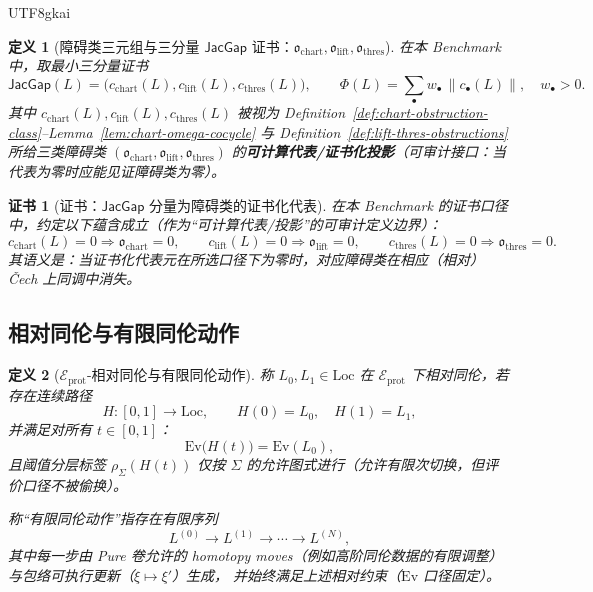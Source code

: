 \documentclass[12pt]{article}
\newtheorem{definition}{定义}[section]
\newtheorem{certificate}{证书}[section]
\newcommand{\JacGap}{\ensuremath{\mathsf{JacGap}}}
\begin{document}
\begin{CJK*}{UTF8}{gkai}
\begin{definition}[障碍类三元组与三分量 $\JacGap$ 证书：$\mathfrak{o}_{\mathrm{chart}},\mathfrak{o}_{\mathrm{lift}},\mathfrak{o}
  _{\mathrm{thres}}$]
\label{def:obstruction-triple}
在本 Benchmark 中，取最小三分量证书
\[
\JacGap(L)=\bigl(c_{\mathrm{chart}}(L),c_{\mathrm{lift}}(L),c_{\mathrm{thres}}(L)\bigr),
\qquad
\Phi(L)=\sum_{\bullet} w_{\bullet}\,\|c_{\bullet}(L)\|,\quad w_{\bullet}>0.
\]
其中 $c_{\mathrm{chart}}(L),c_{\mathrm{lift}}(L),c_{\mathrm{thres}}(L)$ 被视为
Definition~\ref{def:chart-obstruction-class}--Lemma~\ref{lem:chart-omega-cocycle} 与 Definition~\ref{def:lift-thres-obstructions}
所给三类障碍类
$(\mathfrak{o}_{\mathrm{chart}},\mathfrak{o}_{\mathrm{lift}},\mathfrak{o}_{\mathrm{thres}})$
的\textbf{可计算代表/证书化投影}（可审计接口：当代表为零时应能见证障碍类为零）。
\end{definition}

\begin{certificate}[证书：$\JacGap$ 分量为障碍类的证书化代表]
\label{cert:jacgap-as-obstruction}
在本 Benchmark 的证书口径中，约定以下蕴含成立（作为“可计算代表/投影”的可审计定义边界）：
\[
c_{\mathrm{chart}}(L)=0\Rightarrow \mathfrak{o}_{\mathrm{chart}}=0,\qquad
c_{\mathrm{lift}}(L)=0\Rightarrow \mathfrak{o}_{\mathrm{lift}}=0,\qquad
c_{\mathrm{thres}}(L)=0\Rightarrow \mathfrak{o}_{\mathrm{thres}}=0.
\]
其语义是：当证书化代表元在所选口径下为零时，对应障碍类在相应（相对）Čech 上同调中消失。
\end{certificate}

\subsection{相对同伦与有限同伦动作}

\begin{definition}[\textrm{$\mathcal{E}_{\mathrm{prot}}$}-相对同伦与有限同伦动作]
\label{def:relative-homotopy-finite-moves}
称 $L_0,L_1\in\mathrm{Loc}$ 在 $\mathcal{E}_{\mathrm{prot}}$ 下相对同伦，若存在连续路径
\[
H:[0,1]\to \mathrm{Loc},\qquad H(0)=L_0,\quad H(1)=L_1,
\]
并满足对所有 $t\in[0,1]$：
\[
\mathrm{Ev}\bigl(H(t)\bigr)=\mathrm{Ev}(L_0),
\]
且阈值分层标签 $\rho_{\Sigma}(H(t))$ 仅按 $\Sigma$ 的允许图式进行（允许有限次切换，但评价口径不被偷换）。

称“有限同伦动作”指存在有限序列
\[
L^{(0)}\to L^{(1)}\to\cdots\to L^{(N)},
\]
其中每一步由 Pure 卷允许的 homotopy moves（例如高阶同伦数据的有限调整）与包络可执行更新（$\xi\mapsto\xi'$）生成，
并始终满足上述相对约束（$\mathrm{Ev}$ 口径固定）。
\end{definition}


\end{CJK*}
\end{document}
